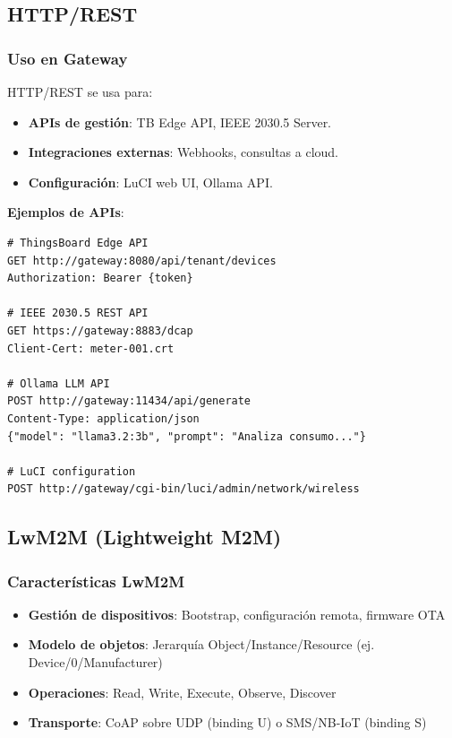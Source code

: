 \subsection{HTTP/REST}

\subsubsection{Uso en Gateway}

HTTP/REST se usa para:
\begin{itemize}
    \item \textbf{APIs de gestión}: TB Edge API, IEEE 2030.5 Server.
    \item \textbf{Integraciones externas}: Webhooks, consultas a cloud.
    \item \textbf{Configuración}: LuCI web UI, Ollama API.
\end{itemize}

\textbf{Ejemplos de APIs}:
\begin{verbatim}
# ThingsBoard Edge API
GET http://gateway:8080/api/tenant/devices
Authorization: Bearer {token}

# IEEE 2030.5 REST API
GET https://gateway:8883/dcap
Client-Cert: meter-001.crt

# Ollama LLM API
POST http://gateway:11434/api/generate
Content-Type: application/json
{"model": "llama3.2:3b", "prompt": "Analiza consumo..."}

# LuCI configuration
POST http://gateway/cgi-bin/luci/admin/network/wireless
\end{verbatim}

\subsection{LwM2M (Lightweight M2M)}

\subsubsection{Características LwM2M}

\begin{itemize}
    \item \textbf{Gestión de dispositivos}: Bootstrap, configuración remota, firmware OTA
    \item \textbf{Modelo de objetos}: Jerarquía Object/Instance/Resource (ej. Device/0/Manufacturer)
    \item \textbf{Operaciones}: Read, Write, Execute, Observe, Discover
    \item \textbf{Transporte}: CoAP sobre UDP (binding U) o SMS/NB-IoT (binding S)
\end{itemize}

